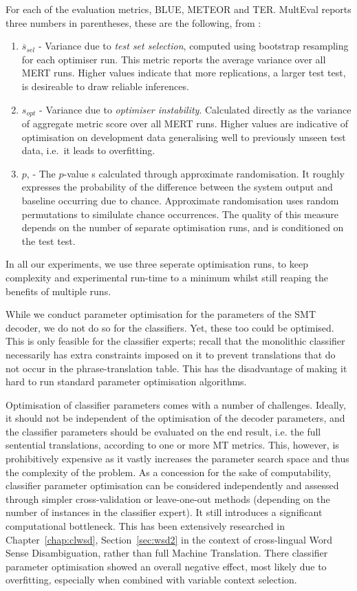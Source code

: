 For each of the evaluation metrics, BLUE, METEOR and TER. MultEval reports
three numbers in parentheses, these are the following, from \cite{MERTCONTROL}:

\begin{enumerate}
\item $\overline{s}_{sel}$ - Variance due to \emph{test set selection},
computed using bootstrap resampling for each optimiser run. This metric reports
the average variance over all MERT runs. Higher values indicate that more
replications, a larger test test, is desireable to draw reliable inferences.
\item $s_{opt}$ - Variance due to \emph{optimiser instability}. Calculated
directly as the variance of aggregate metric score over all MERT runs. Higher
values are indicative of optimisation on development data generalising well to
previously unseen test data, i.e.\ it leads to overfitting. 
\item $p$, - The $p$-value s calculated through approximate randomisation. It roughly
expresses the probability of the difference between the system output and
baseline occurring due to chance. Approximate randomisation uses random
permutations to similulate chance occurrences. The quality of this measure depends on the number of separate
optimisation runs, and is conditioned on the test test. 
\end{enumerate}

In all our experiments, we use three seperate optimisation runs, to keep
complexity and experimental run-time to a minimum whilst still reaping the
benefits of multiple runs.

While we conduct parameter optimisation for the parameters of the SMT
decoder, we do not do so for the classifiers. Yet, these too could
be optimised. This is only feasible for the classifier experts; recall
that the monolithic classifier necessarily has extra constraints
imposed on it to prevent translations that do not occur in the
phrase-translation table. This has the disadvantage of making it hard
to run standard parameter optimisation algorithms.

Optimisation of classifier parameters comes with a number of challenges.
Ideally, it should not be independent of the optimisation of the decoder
parameters, and the classifier parameters should be evaluated on the
end result, i.e. the full sentential translations, according to one or more MT
metrics. This, however, is prohibitively expensive as it vastly increases the
parameter search space and thus the complexity of the problem. As a concession
for the sake of computability, classifier parameter optimisation can be considered
independently and assessed through simpler cross-validation or leave-one-out
methods (depending on the number of instances in the classifier expert).  It
still introduces a significant computational bottleneck.  
This has been extensively researched in Chapter~\ref{chap:clwsd}, Section~\ref{sec:wsd2} in
the context of cross-lingual Word Sense Disambiguation, rather than full
Machine Translation. There classifier parameter optimisation showed an
overall negative effect, most likely due to overfitting, especially when
combined with variable context selection. 

